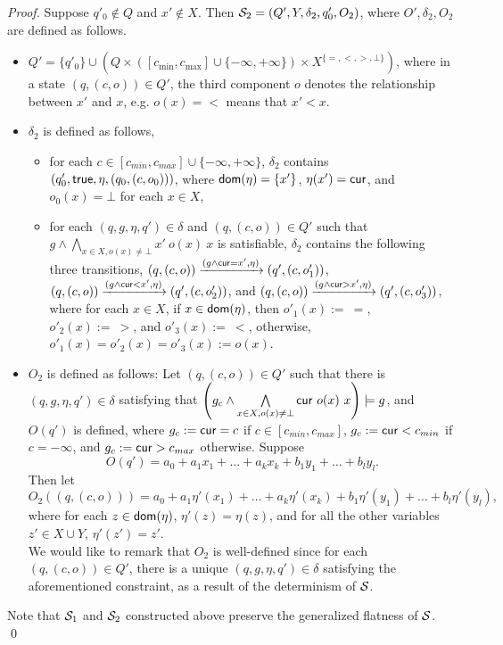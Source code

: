\begin{appendix}
\begin{proof}
Suppose $q'_{0} \not \in Q$ and $x' \not \in X$. Then ${\mathcal{S} }_2 = (Q', Y, \delta_2, q'_{0}, O_2)$, where $O',\delta_2,O_2$ are defined as follows. 
\begin{itemize}
\item $Q' = \{q'_0\} \cup \left(Q \times \left([c_{\min}, c_{\max}] \cup \{-\infty,+\infty\}\right) \times X^{\{=, <, >,\bot\}} \right)$, where in a state $(q,(c, o)) \in Q'$, the third component $o$ denotes the relationship between $x'$ and $x$, e.g. $o(x)=<$ means that $x' < x$.
%
\item $\delta_2$ is defined as follows, 
\begin{itemize}
\item for each $c \in [c_{min}, c_{max}] \cup \{-\infty,+\infty\}$, $\delta_2$ contains $(q'_0,\mathsf{true},\eta, (q_0,(c, o_0)))$, where $\mathsf{dom}(\eta)=\{x'\}$, $\eta(x')=\mathsf{cur}$, and $o_0(x) = \bot$ for each $x \in X$,
%
\item for each $(q,g,\eta,q') \in \delta$ and $(q,(c,o)) \in Q'$ such that $g \wedge \bigwedge \limits_{x \in X, o(x) \neq \bot} x'\ o(x)\ x$ is satisfiable, $\delta_2$ contains the following three transitions, 
$(q,(c,o)) \xrightarrow{(g \wedge \mathsf{cur} = x', \eta)} (q',(c,o'_1))$, 
$(q,(c,o)) \xrightarrow{(g \wedge \mathsf{cur}< x', \eta)}  (q',(c,o'_2))$,
and  $(q,(c,o)) \xrightarrow{(g \wedge \mathsf{cur} > x', \eta)} (q',(c,o'_3))$, where 
for each $x \in X$, if $x \in \mathsf{dom}(\eta)$, then $o'_1(x) := \ =$, $o'_2(x):=\ >$, and $o'_3(x) :=\ <$, otherwise, $o'_1(x) = o'_2(x) = o'_3(x) := o(x)$.
\end{itemize}
%
\item $O_2$ is defined as follows: Let $(q,(c,o)) \in Q'$  such that there is $(q,g,\eta,q') \in \delta$ satisfying that $\left(g_c \wedge \bigwedge \limits_{x \in X, o(x) \neq \bot} \mathsf{cur}\ o(x)\ x \right) \models g$, and $O(q')$ is defined, where $g_c := \mathsf{cur} = c$ if $c \in [c_{min}, c_{max}]$, $g_c:=\mathsf{cur} < c_{min}$ if $c=-\infty$, and $g_c:=\mathsf{cur} > c_{max}$ otherwise. Suppose 
\[O(q')=a_0 + a_1 x_1 + \dots + a_k x_k + b_1 y_1 + \dots + b_l y_l.\]
Then let
\[O_2((q,(c,o)))=a_0 + a_1 \eta'(x_1) + \dots + a_k \eta'(x_k) + b_1 \eta'(y_1) + \dots + b_l \eta'(y_l),\]
where for each $z \in \mathsf{dom}(\eta)$, $\eta'(z)=\eta(z)$, and for all the other variables $z' \in X \cup Y$, $\eta'(z')=z'$.  \\
We would like to remark that $O_2$ is well-defined since for each $(q,(c,o)) \in Q'$, there is a unique $(q,g,\eta,q') \in \delta$ satisfying the aforementioned constraint, as a result of the determinism of ${\mathcal{S} }$.
\end{itemize}
%
Note that ${\mathcal{S} }_1$ and ${\mathcal{S} }_2$ constructed above preserve the generalized flatness of ${\mathcal{S} }$.
\qed
\end{proof}



\end{appendix}
